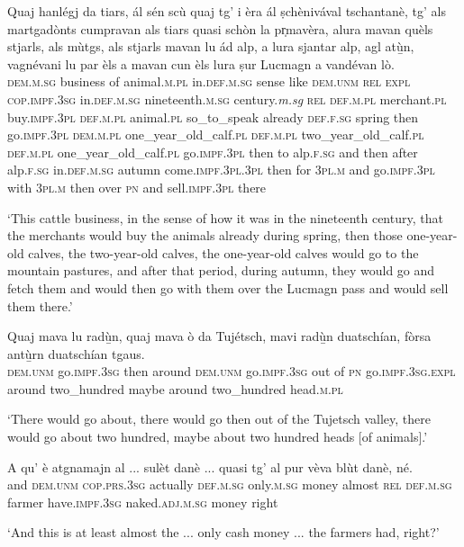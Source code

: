 \begin{linenumbers}
\gll Quaj hanlégj da tiars, ál sén scù quaj tg' i èra ál ṣchènivával tschantanè, tg' als martgadònts cumpravan als tiars quasi schòn la pr̩mavèra, alura mavan quèls stjarls, als mùtgs, als stjarls mavan lu ád alp, a lura sjantar alp, agl atù̱n, vagnévani lu par èls a mavan cun èls lura ṣur Lucmagn a vandévan lò.\\
\textsc{dem.m.sg} business of animal.\textsc{m.pl} in.\textsc{def.m.sg} sense like \textsc{dem.unm} \textsc{rel} \textsc{expl} \textsc{cop.impf.3sg} in.\textsc{def.m.sg} nineteenth.\textsc{m.sg} century.\textit{m.sg} \textsc{rel} \textsc{def.m.pl} merchant.\textsc{pl} buy.\textsc{impf.3pl} \textsc{def.m.pl} animal.\textsc{pl} so\_to\_speak already \textsc{def.f.sg} spring then go.\textsc{impf.3pl} \textsc{dem.m.pl} one\_year\_old\_calf.\textsc{pl} \textsc{def.m.pl} two\_year\_old\_calf.\textsc{pl} \textsc{def.m.pl} one\_year\_old\_calf.\textsc{pl} go.\textsc{impf.3pl} then to alp.\textsc{f.sg} and then after alp.\textsc{f.sg} in.\textsc{def.m.sg} autumn come.\textsc{impf.3pl.3pl} then for \textsc{3pl.m} and go.\textsc{impf.3pl} with \textsc{3pl.m} then over \textsc{pn} and sell.\textsc{impf.3pl} there\\
\end{linenumbers}
\medskip
\glt`This cattle business, in the sense of how it was in the nineteenth century, that the merchants would buy the animals already during spring, then those one-year-old calves, the two-year-old calves, the one-year-old calves would go to the mountain pastures, and after that period, during autumn, they would go and fetch them and would then go with them over the Lucmagn pass and would sell them there.'
\medskip

\begin{linenumbers}
\gll Quaj mava lu radù̱n, quaj mava ò da Tujétsch, mavi radù̱n duatschían, fòrsa antù̱rn duatschían tgaus.\\
\textsc{dem.unm} go.\textsc{impf.3sg} then around \textsc{dem.unm} go.\textsc{impf.3sg} out of \textsc{pn} go.\textsc{impf.3sg.expl} around two\_hundred maybe around two\_hundred head.\textsc{m.pl}\\
\end{linenumbers}
\medskip
\glt `There would go about, there would go then out of the Tujetsch valley, there would go about two hundred, maybe about two hundred heads [of animals].'
\medskip

\begin{linenumbers}
\gll A qu’ è atgnamajn al ... sulèt danè ... quasi tg’ al pur vèva blùt danè, né.\\
and \textsc{dem.unm} \textsc{cop.prs.3sg} actually \textsc{def.m.sg} {} only.\textsc{m.sg} money {} almost \textsc{rel} \textsc{def.m.sg} farmer have.\textsc{impf.3sg} naked.\textsc{adj.m.sg} money right \\ 
\end{linenumbers}
\medskip
\glt `And this is at least almost the ... only cash money ... the farmers had, right?'
\medskip

